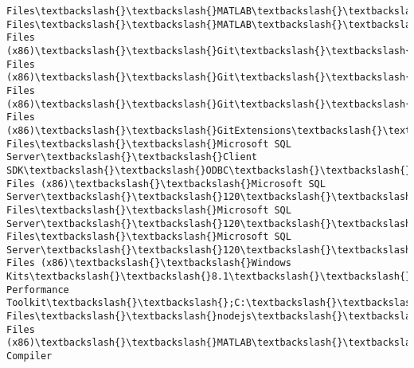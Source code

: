 \documentclass[11pt]{article}
\begin{document}
\begin{Verbatim}[commandchars=\\\{\}]
Files\textbackslash{}\textbackslash{}MATLAB\textbackslash{}\textbackslash{}R2016b\textbackslash{}\textbackslash{}bin;C:\textbackslash{}\textbackslash{}Program Files\textbackslash{}\textbackslash{}MATLAB\textbackslash{}\textbackslash{}R2016b\textbackslash{}\textbackslash{}polyspace\textbackslash{}\textbackslash{}bin;C:\textbackslash{}\textbackslash{}Program Files (x86)\textbackslash{}\textbackslash{}Git\textbackslash{}\textbackslash{}cmd;C:\textbackslash{}\textbackslash{}Program Files (x86)\textbackslash{}\textbackslash{}Git\textbackslash{}\textbackslash{}mingw32\textbackslash{}\textbackslash{}bin;C:\textbackslash{}\textbackslash{}Program Files (x86)\textbackslash{}\textbackslash{}Git\textbackslash{}\textbackslash{}usr\textbackslash{}\textbackslash{}bin;C:\textbackslash{}\textbackslash{}Program Files (x86)\textbackslash{}\textbackslash{}GitExtensions\textbackslash{}\textbackslash{};C:\textbackslash{}\textbackslash{}WINDOWS\textbackslash{}\textbackslash{}system32;C:\textbackslash{}\textbackslash{}WINDOWS;C:\textbackslash{}\textbackslash{}WINDOWS\textbackslash{}\textbackslash{}System32\textbackslash{}\textbackslash{}Wbem;C:\textbackslash{}\textbackslash{}WINDOWS\textbackslash{}\textbackslash{}System32\textbackslash{}\textbackslash{}WindowsPowerShell\textbackslash{}\textbackslash{}v1.0\textbackslash{}\textbackslash{};C:\textbackslash{}\textbackslash{}Program Files\textbackslash{}\textbackslash{}Microsoft SQL Server\textbackslash{}\textbackslash{}Client SDK\textbackslash{}\textbackslash{}ODBC\textbackslash{}\textbackslash{}110\textbackslash{}\textbackslash{}Tools\textbackslash{}\textbackslash{}Binn\textbackslash{}\textbackslash{};C:\textbackslash{}\textbackslash{}Program Files (x86)\textbackslash{}\textbackslash{}Microsoft SQL Server\textbackslash{}\textbackslash{}120\textbackslash{}\textbackslash{}Tools\textbackslash{}\textbackslash{}Binn\textbackslash{}\textbackslash{};C:\textbackslash{}\textbackslash{}Program Files\textbackslash{}\textbackslash{}Microsoft SQL Server\textbackslash{}\textbackslash{}120\textbackslash{}\textbackslash{}Tools\textbackslash{}\textbackslash{}Binn\textbackslash{}\textbackslash{};C:\textbackslash{}\textbackslash{}Program Files\textbackslash{}\textbackslash{}Microsoft SQL Server\textbackslash{}\textbackslash{}120\textbackslash{}\textbackslash{}DTS\textbackslash{}\textbackslash{}Binn\textbackslash{}\textbackslash{};C:\textbackslash{}\textbackslash{}Program Files (x86)\textbackslash{}\textbackslash{}Windows Kits\textbackslash{}\textbackslash{}8.1\textbackslash{}\textbackslash{}Windows Performance Toolkit\textbackslash{}\textbackslash{};C:\textbackslash{}\textbackslash{}Program Files\textbackslash{}\textbackslash{}nodejs\textbackslash{}\textbackslash{};C:\textbackslash{}\textbackslash{}CIFER\_Student\textbackslash{}\textbackslash{}bin;C:\textbackslash{}\textbackslash{}CIFER\_Student\textbackslash{}\textbackslash{}bin;C:\textbackslash{}\textbackslash{}Program Files (x86)\textbackslash{}\textbackslash{}MATLAB\textbackslash{}\textbackslash{}MATLAB Compiler 
\end{Verbatim}
\end{document}
